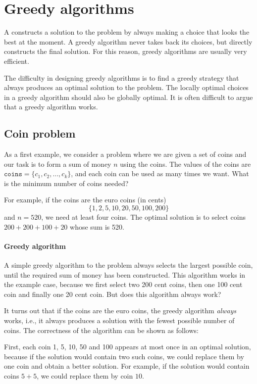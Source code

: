 \chapter{Greedy algorithms}


A 
constructs a solution to the problem
by always making a choice that looks
the best at the moment.
A greedy algorithm never takes back
its choices, but directly constructs
the final solution.
For this reason, greedy algorithms
are usually very efficient.

The difficulty in designing greedy algorithms
is to find a greedy strategy
that always produces an optimal solution
to the problem.
The locally optimal choices in a greedy
algorithm should also be globally optimal.
It is often difficult to argue that
a greedy algorithm works.

\section{Coin problem}

As a first example, we consider a problem
where we are given a set of coins
and our task is to form a sum of money $n$
using the coins.
The values of the coins are
$\texttt{coins}=\{c_1,c_2,\ldots,c_k\}$,
and each coin can be used as many times we want.
What is the minimum number of coins needed?

For example, if the coins are the euro coins (in cents)
\[\{1,2,5,10,20,50,100,200\}\]
and $n=520$,
we need at least four coins.
The optimal solution is to select coins
$200+200+100+20$ whose sum is 520.

\subsubsection{Greedy algorithm}

A simple greedy algorithm to the problem
always selects the largest possible coin,
until the required sum of money has been constructed.
This algorithm works in the example case,
because we first select two 200 cent coins,
then one 100 cent coin and finally one 20 cent coin.
But does this algorithm always work?

It turns out that if the coins are the euro coins,
the greedy algorithm \emph{always} works, i.e.,
it always produces a solution with the fewest
possible number of coins.
The correctness of the algorithm can be
shown as follows:

First, each coin 1, 5, 10, 50 and 100 appears
at most once in an optimal solution,
because if the
solution would contain two such coins,
we could replace them by one coin and
obtain a better solution.
For example, if the solution would contain
coins $5+5$, we could replace them by coin $10$.

